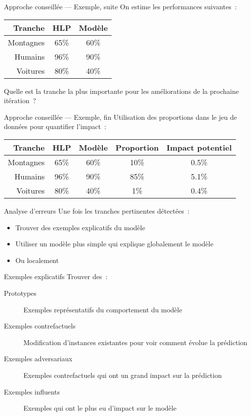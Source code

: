 \begin{frame}{Approche conseillée — Exemple, suite}
  On estime les performances suivantes~:

  \begin{tabular}{rcc}
    \toprule
    Tranche   & HLP  & Modèle \\
    \midrule
    Montagnes & 65\% & 60\%   \\
    Humains   & 96\% & 90\%   \\
    Voitures  & 80\% & 40\%   \\
    \bottomrule
  \end{tabular}

  Quelle est la tranche la plus importante pour les améliorations de la prochaine itération~?
\end{frame}

\begin{frame}{Approche conseillée — Exemple, fin}
  Utilisation des proportions dans le jeu de données pour quantifier l'impact~:

  \begin{tabular}{rcccc}
    \toprule
    Tranche   & HLP  & Modèle & Proportion & Impact potentiel \\
    \midrule
    Montagnes & 65\% & 60\%   & 10\%       & 0.5\% \\
    Humains   & 96\% & 90\%   & 85\%       & 5.1\% \\
    Voitures  & 80\% & 40\%   & 1\%        & 0.4\% \\
    \bottomrule
  \end{tabular}
\end{frame}

\begin{frame}{Analyse d'erreurs}
  Une fois les tranches pertinentes détectées~:

  \begin{itemize}
    \item Trouver des exemples explicatifs du modèle
    \item Utiliser un modèle plus simple qui explique globalement le modèle
    \item Ou localement
  \end{itemize}
\end{frame}

\begin{frame}{Exemples explicatifs}
  Trouver des~:
  \begin{description}
    \item[Prototypes] Exemples représentatifs du comportement du modèle
    \item[Exemples contrefactuels] Modification d'instances existantes pour voir comment évolue la prédiction
    \item[Exemples adversariaux] Exemples contrefactuels qui ont un grand impact sur la prédiction
    \item[Exemples influents] Exemples qui ont le plus eu d'impact sur le modèle
  \end{description}
\end{frame}

